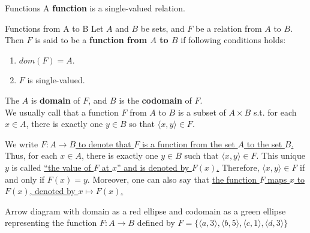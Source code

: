 \begin{definition}{Functions}{}
    A \textbf{function} is a single-valued relation.
\end{definition}

\begin{definition}{Functions from A to B}{}
    Let $A$ and $B$ be sets, and $F$ be a relation from $A$ to $B$. Then $F$ is
    said to be a \textbf{function from $A$ to $B$} if following
    conditions holds:
    \begin{enumerate}

        \item $dom(F) = A$.
        \item $F$ is single-valued.

    \end{enumerate}
    The $A$ is \textbf{domain} of $F$, and $B$ is the
    \textbf{codomain} of $F$.\\
    We usually call that a function $F$ from $A$ to $B$ is a subset of
    $A \times B$ s.t. for each $x \in A$, there is exactly one $y \in
    B$ so that $\langle x,y \rangle \in F$.
\end{definition}

We write \underline{$F : A \to B$ to denote that $F$ is a function
from the set $A$ to the set $B$.} Thus, for each $x \in A$, there is
exactly one $y \in B$ such that $\langle x, y \rangle \in F$. This
unique $y$ is called \underline{“the value of $F$ at $x$” and is
denoted by $F(x)$.} Therefore, $\langle x, y \rangle \in F$ if and
only if $F(x) = y$.
Moreover, one can also say that \underline{the function $F$ maps $x$
to $F(x)$, denoted by $x \mapsto F(x)$.}

\begin{examples}
    Arrow diagram with domain as a red ellipse and codomain as a green
    ellipse representing the function \( F: A \to B \) defined by \( F
        = \{\langle a, 3 \rangle, \langle b, 5 \rangle, \langle c, 1
    \rangle, \langle d, 3 \rangle\} \)
\end{examples}

